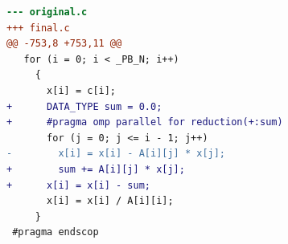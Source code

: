 \begin{lstlisting}[language=diff,basicstyle=\ttfamily\scriptsize,breaklines=true,caption={polybench/trisolv — parallel-speed-not-measurable (pilot4)}]
--- original.c
+++ final.c
@@ -753,8 +753,11 @@
   for (i = 0; i < _PB_N; i++)
     {
       x[i] = c[i];
+      DATA_TYPE sum = 0.0;
+      #pragma omp parallel for reduction(+:sum)
       for (j = 0; j <= i - 1; j++)
-        x[i] = x[i] - A[i][j] * x[j];
+        sum += A[i][j] * x[j];
+      x[i] = x[i] - sum;
       x[i] = x[i] / A[i][i];
     }
 #pragma endscop
\end{lstlisting}
